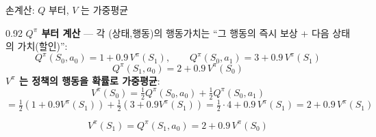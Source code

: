 \begin{frame}{손계산: $Q$ 부터, $V$ 는 가중평균}
\begin{center}\begin{varwidth}{0.92\textwidth}
  \textbf{$Q^\pi$ 부터 계산} --- 각 (상태,행동)의 행동가치는
  ``그 행동의 즉시 보상 + 다음 상태의 가치(할인)'':
  \[
  Q^\pi(S_0, a_0) = 1 + 0.9\,V^\pi(S_1), \qquad
  Q^\pi(S_0, a_1) = 3 + 0.9\,V^\pi(S_1)
  \]
  \[
  Q^\pi(S_1, a_0) = 2 + 0.9\,V^\pi(S_0)
  \]
  \textbf{$V^\pi$ 는 정책의 행동을 확률로 가중평균}:
  \[
  V^\pi(S_0) = \tfrac{1}{2}Q^\pi(S_0,a_0) + \tfrac{1}{2}Q^\pi(S_0,a_1)
  \]
  \[
  = \tfrac{1}{2}(1+0.9V^\pi(S_1)) + \tfrac{1}{2}(3+0.9V^\pi(S_1))
  = \tfrac{1}{2}\cdot 4 + 0.9\,V^\pi(S_1) = 2 + 0.9\,V^\pi(S_1)
  \]
  
  \[
  V^\pi(S_1) = Q^\pi(S_1,a_0) = 2 + 0.9\,V^\pi(S_0)
  \]
\end{varwidth}\end{center}
\end{frame}
